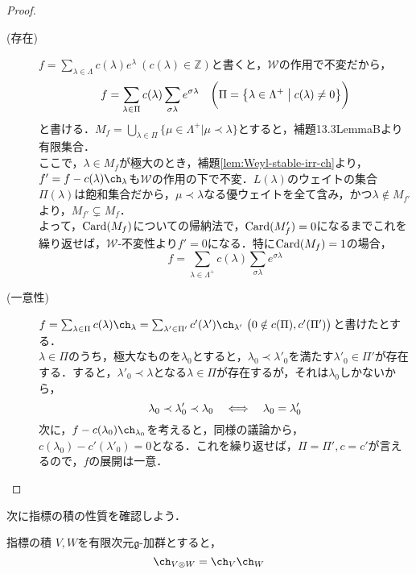 \documentclass[rep_main]{subfiles}
\begin{document}
\begin{proof}
	\begin{description}
		\item[(存在)] $f = \sum_{\lambda \in \Lambda} c(\lambda)e^\lambda\ (c(\lambda) \in \mathbb{Z})$と書くと，$\mathscr{W}$の作用で不変だから，
		\begin{equation}
			f = \sum_{\lambda \in \Pi} c(\lambda) \sum_{\sigma\lambda} e^{\sigma\lambda}\quad  \biggl(\Pi = \bigl\{\lambda \in \Lambda^+ \bigm| c(\lambda) \neq 0\bigr\}\biggr)
		\end{equation}
		と書ける．$M_f = \bigcup_{\lambda \in \Pi} \{\mu \in \Lambda^+ | \mu \prec \lambda\}$とすると，補題13.3LemmaBより有限集合．\\
		ここで，$\lambda \in M_f$が極大のとき，補題\ref{lem:Weyl-stable-irr-ch}より，$f' = f - c(\lambda)\ch_\lambda$も$\mathscr{W}$の作用の下で不変．$L(\lambda)$のウェイトの集合$\Pi(\lambda)$は飽和集合だから，$\mu \prec \lambda$なる優ウェイトを全て含み，かつ$\lambda \notin M_{f'}$より，$M_{f'} \subsetneq M_f$．\\
		よって，$\operatorname{Card}(M_f)$についての帰納法で，$\operatorname{Card}(M_f') = 0$になるまでこれを繰り返せば，$\mathscr{W}$-不変性より$f' = 0$になる．特に$\operatorname{Card}(M_f) = 1$の場合，
		\begin{equation}
			f = \sum_{\lambda \in \Lambda^+} c(\lambda) \sum_{\sigma\lambda} e^{\sigma\lambda}
		\end{equation}
		\item[(一意性)] $f = \sum_{\lambda \in \Pi} c(\lambda)\ch_\lambda = \sum_{\lambda' \in \Pi'} c'(\lambda')\ch_{\lambda'}\ \bigl(0 \notin c(\Pi), c'(\Pi')\bigr)$と書けたとする．\\
		$\lambda \in \Pi$のうち，極大なものを$\lambda_0$とすると，$\lambda_0 \prec \lambda'_0$を満たす$\lambda'_0 \in \Pi'$が存在する．すると，$\lambda'_0 \prec \lambda$となる$\lambda \in \Pi$が存在するが，それは$\lambda_0$しかないから，
		\begin{equation}
			\lambda_0 \prec \lambda'_0 \prec \lambda_0  \quad \Longleftrightarrow \quad  \lambda_0 = \lambda'_0
		\end{equation}
		次に，$f - c(\lambda_0)\ch_{\lambda_0}$を考えると，同様の議論から，$c(\lambda_0) - c'(\lambda'_0) = 0$となる．これを繰り返せば，$\Pi = \Pi', c = c'$が言えるので，$f$の展開は一意．
	\end{description}
\end{proof}
次に指標の積の性質を確認しよう．
\begin{myprop}[label=prop:alg-character-multiply]{指標の積}
	$V, W$を有限次元$\mathfrak{g}$-加群とすると，
	\begin{equation}
		\ch_{V \otimes W} = \ch_V\ch_W
	\end{equation}
\end{myprop}
\end{document}
